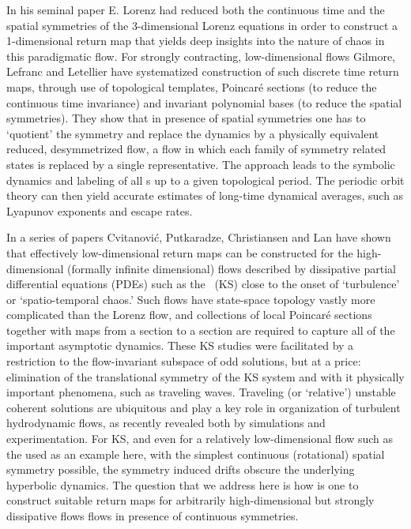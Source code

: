 %
In his seminal paper E. Lorenz had reduced both
the continuous time and the spatial symmetries of the
3-dimensional Lorenz equations in order to construct a
1-dimensional return map that yields deep
insights into the nature of chaos in this
paradigmatic flow. For strongly contracting, low-dimensional
flows Gilmore, Lefranc and
Letellier have systematized
construction of such discrete time return maps, through use
of topological templates, Poincar\'e sections (to reduce the
continuous time invariance) and invariant polynomial bases
(to reduce the spatial symmetries). They show that in
presence of spatial symmetries one has to  `quotient' the
symmetry and replace the dynamics by a physically equivalent
reduced, desymmetrized flow, a flow in which each family of
symmetry related states is replaced by a single
representative. The approach leads to the symbolic dynamics
and labeling of all \po s up to a given topological period.
The periodic orbit theory can then yield accurate estimates
of long-time dynamical averages, such as Lyapunov exponents
and escape rates.

In a series of papers Cvitanovi\'{c}, Putkaradze,
Christiansen and Lan%
have shown that effectively low-dimensional return maps can
be constructed for the high-dimensional (formally infinite
dimensional)  flows described by dissipative partial differential
equations (PDEs) such as the \KSe\ (KS) close to the onset of
`turbulence' or `spatio-temporal chaos.' Such flows have
state-space topology vastly more complicated than the Lorenz
flow, and collections of local Poincar\'e sections together
with maps from a section to a section are required to capture all
of the important asymptotic dynamics.
These KS studies were facilitated by a restriction to the
flow-invariant subspace of odd solutions, but at a price:
elimination of the translational symmetry of the KS system
and with it physically important phenomena, such as traveling
waves. Traveling (or `relative') unstable coherent solutions
are ubiquitous and play a key role in organization of
turbulent hydrodynamic flows, as recently revealed both by
simulations and
experimentation.
For KS, and even for a relatively
low-dimensional flow such as the
\cLe{} used as an example here, with
the simplest continuous (rotational) spatial symmetry
possible, the symmetry induced drifts obscure the underlying
hyperbolic dynamics. The question that we address here is how
is one to construct suitable return maps for arbitrarily
high-dimensional but strongly dissipative flows flows in
presence of continuous symmetries.

